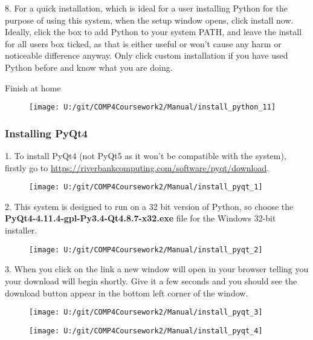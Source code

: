 8. For a quick installation, which is ideal for a user installing Python for the purpose of using this system, when the setup window opens, click install now. Ideally, click the box to add Python to your system PATH, and leave the install for all users box ticked, as that is either useful or won't cause any harm or noticeable difference anyway. Only click custom installation if you have used Python before and know what you are doing.

Finish at home



\begin{figure}[H]
    \texttt{[image: U:/git/COMP4Coursework2/Manual/install\_python\_11]}
\end{figure}

\subsubsection{Installing PyQt4}

1. To install PyQt4 (not PyQt5 as it won't be compatible with the system), firstly go to \url{https://riverbankcomputing.com/software/pyqt/download}.

\begin{figure}[H]
    \texttt{[image: U:/git/COMP4Coursework2/Manual/install\_pyqt\_1]}
\end{figure}

2. This system is designed to run on a 32 bit version of Python, so choose the \textbf{PyQt4-4.11.4-gpl-Py3.4-Qt4.8.7-x32.exe} file for the Windows 32-bit installer.

\begin{figure}[H]
    \texttt{[image: U:/git/COMP4Coursework2/Manual/install\_pyqt\_2]}
\end{figure}

3. When you click on the link a new window will open in your browser telling you your download will begin shortly. Give it a few seconds and you should see the download button appear in the bottom left corner of the window.

\begin{figure}[H]
    \texttt{[image: U:/git/COMP4Coursework2/Manual/install\_pyqt\_3]}
\end{figure}

\begin{figure}[H]
    \texttt{[image: U:/git/COMP4Coursework2/Manual/install\_pyqt\_4]}
\end{figure}

